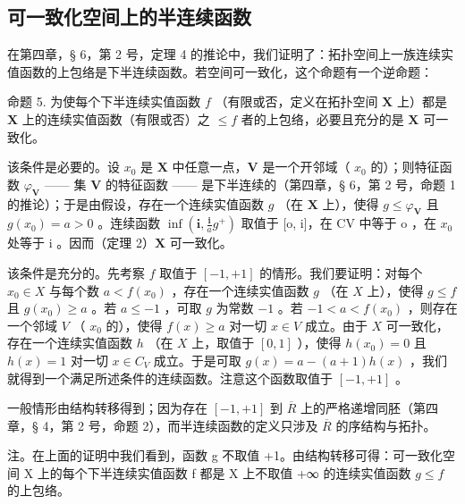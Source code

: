 \subsection{可一致化空间上的半连续函数}

在第四章，§ 6，第 2 号，定理 4 的推论中，我们证明了：拓扑空间上一族连续实值函数的上包络是下半连续函数。若空间可一致化，这个命题有一个逆命题：

命题 5. 为使每个下半连续实值函数 \(f\) （有限或否，定义在拓扑空间 \(\mathbf{X}\) 上）都是 \(\mathbf{X}\) 上的连续实值函数（有限或否）之 \(\leqslant f\) 者的上包络，必要且充分的是 \(\mathbf{X}\) 可一致化。

该条件是必要的。设 \(x_0\) 是 \(\mathbf{X}\) 中任意一点，\(\mathbf{V}\) 是一个开邻域（ \(x_0\) 的）；则特征函数 \(\varphi_{\mathbf{V}}\) —— 集 \(\mathbf{V}\) 的特征函数 —— 是下半连续的（第四章，§ 6，第 2 号，命题 1 的推论）；于是由假设，存在一个连续实值函数 \(g\) （在 \(\mathbf{X}\) 上），使得 \(g \leqslant \varphi_{\mathbf{V}}\) 且 \(g(x_0) = a > 0\) 。连续函数 \(\inf\left(\mathbf{i}, \frac{\mathbf{i}}{a} g^+\right)\) 取值于 {[}o, i{]}，在 CV 中等于 o ，在 \(x_0\) 处等于 i 。因而（定理 2）\(\mathbf{X}\) 可一致化。

该条件是充分的。先考察 \(f\) 取值于 \([-1, +1]\) 的情形。我们要证明：对每个 \(x_0 \in X\) 与每个数 \(a < f(x_0)\) ，存在一个连续实值函数 \(g\) （在 \(X\) 上），使得 \(g \leqslant f\) 且 \(g(x_0) \geqslant a\) 。若 \(a \leqslant -1\) ，可取 \(g\) 为常数 \(-1\) 。若 \(-1 < a < f(x_0)\) ，则存在一个邻域 \(V\) （ \(x_0\) 的），使得 \(f(x) \geqslant a\) 对一切 \(x \in V\) 成立。由于 \(X\) 可一致化，存在一个连续实值函数 \(h\) （在 \(X\) 上，取值于 \([0, 1]\) ），使得 \(h(x_0) = 0\) 且 \(h(x) = 1\) 对一切 \(x \in C_V\) 成立。于是可取 \(g(x) = a - (a + 1)h(x)\) ，我们就得到一个满足所述条件的连续函数。注意这个函数取值于 \([-1, +1]\) 。

一般情形由结构转移得到；因为存在 \([-1, +1]\) 到 \(\overline{R}\) 上的严格递增同胚（第四章，§ 4，第 2 号，命题 2），而半连续函数的定义只涉及 \(\overline{R}\) 的序结构与拓扑。

注。在上面的证明中我们看到，函数 g 不取值 +1。由结构转移可得：可一致化空间 X 上的每个下半连续实值函数 f 都是 X 上不取值 +∞ 的连续实值函数 \(g \leqslant f\) 的上包络。

